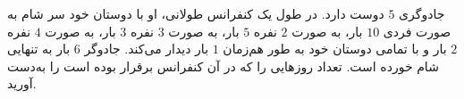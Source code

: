 \p
جادوگری
$5$
دوست دارد. در طول یک کنفرانس طولانی، او با دوستان خود سر شام به صورت فردی
$10$
بار، به صورت
$2$
نفره
$5$
بار، به صورت
$3$
نفره
$3$
بار، به صورت
$4$
نفره
$2$
بار و با تمامی دوستان خود به طور هم‌زمان
$1$
بار دیدار می‌کند. جادوگر
$6$
بار به تنهایی شام خورده است. تعداد روزهایی را که در آن کنفرانس برقرار بوده است را به‌دست آورید.
